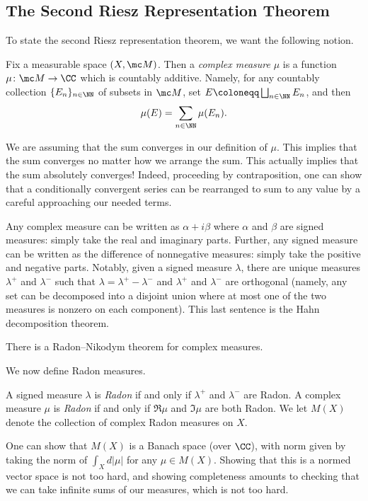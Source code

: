 \documentclass[../notes.tex]{subfiles}
\begin{document}
\subsection{The Second Riesz Representation Theorem}
To state the second Riesz representation theorem, we want the following notion.
\begin{definition}
	Fix a measurable space $(X,\mc M)$. Then a \textit{complex measure} $\mu$ is a function $\mu\colon\mc M\to\CC$ which is countably additive. Namely, for any countably collection $\{E_n\}_{n\in\NN}$ of subsets in $\mc M$, set $E\coloneqq\bigsqcup_{n\in\NN}E_n$, and then
	\[\mu(E)=\sum_{n\in\NN}\mu(E_n).\]
\end{definition}
\begin{remark}
	We are assuming that the sum converges in our definition of $\mu$. This implies that the sum converges no matter how we arrange the sum. This actually implies that the sum absolutely converges! Indeed, proceeding by contraposition, one can show that a conditionally convergent series can be rearranged to sum to any value by a careful approaching our needed terms.
\end{remark}
\begin{remark}
	Any complex measure can be written as $\alpha+i\beta$ where $\alpha$ and $\beta$ are signed measures: simply take the real and imaginary parts. Further, any signed measure can be written as the difference of nonnegative measures: simply take the positive and negative parts. Notably, given a signed measure $\lambda$, there are unique measures $\lambda^+$ and $\lambda^-$ such that $\lambda=\lambda^+-\lambda^-$ and $\lambda^+$ and $\lambda^-$ are orthogonal (namely, any set can be decomposed into a disjoint union where at most one of the two measures is nonzero on each component). This last sentence is the Hahn decomposition theorem.
\end{remark}
\begin{remark}
	There is a Radon--Nikodym theorem for complex measures.
\end{remark}
We now define Radon measures.
\begin{definition}[Radon]
	A signed measure $\lambda$ is \textit{Radon} if and only if $\lambda^+$ and $\lambda^-$ are Radon. A complex measure $\mu$ is \textit{Radon} if and only if $\Re\mu$ and $\Im\mu$ are both Radon. We let $M(X)$ denote the collection of complex Radon measures on $X$.
\end{definition}
\begin{remark}
	One can show that $M(X)$ is a Banach space (over $\CC$), with norm given by taking the norm of $\int_Xd\left|\mu\right|$ for any $\mu\in M(X)$. Showing that this is a normed vector space is not too hard, and showing completeness amounts to checking that we can take infinite sums of our measures, which is not too hard.
\end{remark}
\end{document}
